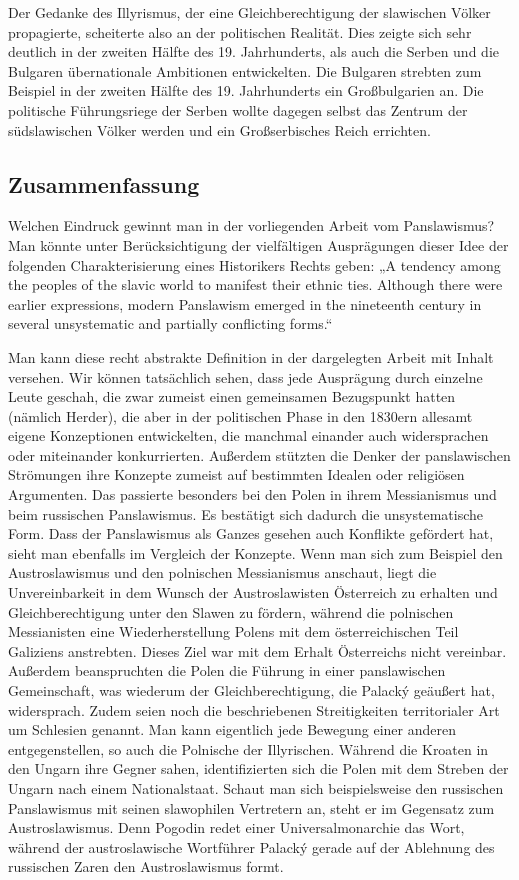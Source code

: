 \documentclass{../../sem_paper}
\begin{document}
Der Gedanke des Illyrismus, der eine Gleichberechtigung der slawischen Völker propagierte,
scheiterte also an der politischen Realität. Dies zeigte sich sehr deutlich in der zweiten Hälfte
des 19. Jahrhunderts, als auch die Serben und die Bulgaren übernationale Ambitionen
entwickelten. Die Bulgaren strebten zum Beispiel in der zweiten Hälfte des 19. Jahrhunderts
ein Großbulgarien an. Die politische Führungsriege der Serben wollte dagegen selbst das
Zentrum der südslawischen Völker werden und ein Großserbisches Reich errichten.\autocite[84]{shidak}

\newpage
{}
\subsection*{Zusammenfassung}
Welchen Eindruck gewinnt man in der vorliegenden Arbeit vom Panslawismus? Man könnte
unter Berücksichtigung der vielfältigen Ausprägungen dieser Idee der folgenden
Charakterisierung eines Historikers Rechts geben: „A tendency among the peoples of the
slavic world to manifest their ethnic ties. Although there were earlier expressions, modern
Panslawism emerged in the nineteenth century in several unsystematic and partially
conflicting forms.“\autocite[232]{nicoll}

Man kann diese recht abstrakte Definition in der dargelegten Arbeit mit Inhalt versehen. Wir
können tatsächlich sehen, dass jede Ausprägung durch einzelne Leute geschah, die zwar
zumeist einen gemeinsamen Bezugspunkt hatten (nämlich Herder), die aber in der politischen
Phase in den 1830ern allesamt eigene Konzeptionen entwickelten, die manchmal einander
auch widersprachen oder miteinander konkurrierten. Außerdem stützten die Denker der
panslawischen Strömungen ihre Konzepte zumeist auf bestimmten Idealen oder religiösen
Argumenten. Das passierte besonders bei den Polen in ihrem Messianismus und beim
russischen Panslawismus. Es bestätigt sich dadurch die unsystematische Form.
Dass der Panslawismus als Ganzes gesehen auch Konflikte gefördert hat, sieht man ebenfalls
im Vergleich der Konzepte. Wenn man sich zum Beispiel den Austroslawismus und den
polnischen Messianismus anschaut, liegt die Unvereinbarkeit in dem Wunsch der
Austroslawisten Österreich zu erhalten und Gleichberechtigung unter den Slawen zu fördern,
während die polnischen Messianisten eine Wiederherstellung Polens mit dem österreichischen
Teil Galiziens anstrebten. Dieses Ziel war mit dem Erhalt Österreichs nicht vereinbar.
Außerdem beanspruchten die Polen die Führung in einer panslawischen Gemeinschaft, was
wiederum der Gleichberechtigung, die Palacký geäußert hat, widersprach. Zudem seien noch
die beschriebenen Streitigkeiten territorialer Art um Schlesien genannt.
Man kann eigentlich jede Bewegung einer anderen entgegenstellen, so auch die Polnische der
Illyrischen. Während die Kroaten in den Ungarn ihre Gegner sahen, identifizierten sich die
Polen mit dem Streben der Ungarn nach einem Nationalstaat. Schaut man sich beispielsweise
den russischen Panslawismus mit seinen slawophilen Vertretern an, steht er im Gegensatz zum
Austroslawismus. Denn Pogodin redet einer Universalmonarchie das Wort, während der
austroslawische Wortführer Palacký gerade auf der Ablehnung des russischen Zaren den
Austroslawismus formt.
\end{document}
